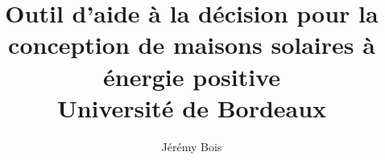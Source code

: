 \documentclass[11pt, oneside]{JeremyThesis}
\title{
    {Outil d’aide à la décision pour la conception de maisons solaires à énergie positive}\\
    {\large Université de Bordeaux}\\
    {}
}
\author{Jérémy Bois}
\date{}
\begin{document}



\begin{titlepage}
    \maketitle
    \thispagestyle{empty}
\end{titlepage}



% 
% 




% 

% 



\clearpage
\footOn


\end{document}
